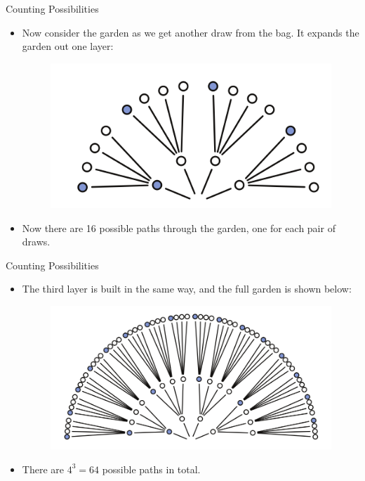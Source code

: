 \documentclass[handout]{beamer}
\begin{document}
\begin{frame}{Counting Possibilities}
\scriptsize{
\begin{itemize}
 \item Now consider the garden as we get another draw from the bag. It expands the garden out one layer:

\begin{figure}[h!]
	\centering
	\includegraphics[scale=0.4]{pics/marbles7.png}
\end{figure}

\item Now there are 16 possible paths through the garden, one for each pair of draws.


\end{itemize}
 } 
\end{frame}


\begin{frame}{Counting Possibilities}
\scriptsize{
\begin{itemize}
 \item The third layer is built in the same way, and the full garden is shown
 below:
\begin{figure}[h!]
	\centering
	\includegraphics[scale=0.3]{pics/marbles8.png}
\end{figure}

\item There are $4^3 = 64$ possible paths in total.

\end{itemize}
 } 
\end{frame}
\end{document}
